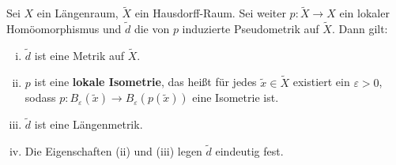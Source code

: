 \begin{satz}
\label{satz:2.24}
	Sei $X$ ein Längenraum, $\tilde{X}$ ein Hausdorff-Raum.
	Sei weiter $p \colon \tilde{X} \rightarrow X$ ein lokaler Homöomorphismus und $\tilde{d}$ die von $p$ induzierte Pseudometrik auf $\tilde{X}$.
	Dann gilt:
	\begin{enumerate}[(i)]
		\item $\tilde{d}$ ist eine Metrik auf $\tilde{X}$.
		\item $p$ ist eine \textbf{lokale Isometrie}, das heißt für jedes $\tilde{x} \in \tilde{X}$ existiert ein $\varepsilon > 0$, sodass $p \colon B_\varepsilon(\tilde{x}) \rightarrow B_\varepsilon(p(\tilde{x}))$ eine Isometrie ist. 
		\item $\tilde{d}$ ist eine Längenmetrik.
		\item Die Eigenschaften (ii) und (iii) legen $\tilde{d}$ eindeutig fest.
	\end{enumerate}
\end{satz}
\newpage
